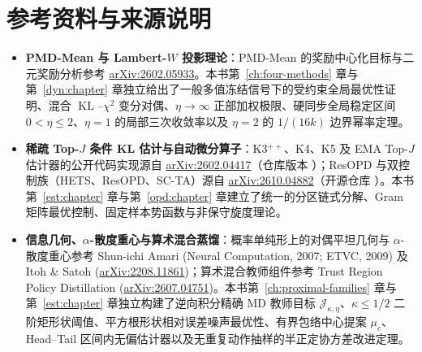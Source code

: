 \documentclass[lang=cn,scheme=chinese,openany]{elegantbook}
\newcommand{\KL}{\operatorname{KL}}
\begin{document}
\chapter*{参考资料与来源说明}
\begingroup\raggedright
\begin{itemize}
\item \textbf{PMD-Mean 与 Lambert-$W$ 投影理论}：PMD-Mean 的奖励中心化目标与二元奖励分析参考 \href{https://arxiv.org/abs/2602.05933}{arXiv:2602.05933}。本书第~\ref{ch:four-methods} 章与第~\ref{dyn:chapter} 章独立给出了一般多值冻结信号下的受约束全局最优性证明、混合 $\KL$--$\chi^2$ 变分对偶、$\eta\to\infty$ 正部加权极限、硬同步全局稳定区间 $0<\eta\le 2$、$\eta=1$ 的局部三次收敛率以及 $\eta=2$ 的 $1/(16k)$ 边界幂率定理。
\item \textbf{稀疏 Top-$J$ 条件 KL 估计与自动微分算子}：K3$^{++}$、K4、K5 及 EMA Top-$J$ 估计器的公开代码实现源自 \href{https://arxiv.org/abs/2602.04417}{arXiv:2602.04417}（仓库版本 \href{https://github.com/LunjunZhang/ema-pg/blob/f9b977632ad948ce935432a517c22291bfaba562/search/verl/trainer/ppo/core_algos.py}{}）；ResOPD 与双控制族（HETS、ResOPD、SC-TA）源自 \href{https://arxiv.org/abs/2610.04882}{arXiv:2610.04882}（开源仓库 \href{https://github.com/InternLM/ResOPD}{}）。本书第~\ref{est:chapter} 章与第~\ref{opd:chapter} 章建立了统一的分区链式分解、Gram 矩阵最优控制、固定样本势函数与非保守旋度理论。
\item \textbf{信息几何、$\alpha$-散度重心与算术混合蒸馏}：概率单纯形上的对偶平坦几何与 $\alpha$-散度重心参考 Shun-ichi Amari (Neural Computation, 2007; ETVC, 2009) 及 Itoh \& Satoh (\href{https://arxiv.org/html/2208.11861}{arXiv:2208.11861})；算术混合教师组件参考 Trust Region Policy Distillation (\href{https://arxiv.org/html/2607.04751v1}{arXiv:2607.04751})。本书第~\ref{ch:proximal-families} 章与第~\ref{est:chapter} 章独立构建了逆向积分精确 MD 教师目标 $\mathcal J_{\kappa,\eta}$、$\kappa\le 1/2$ 二阶矩形状阈值、平方根形状相对误差噪声最优性、有界包络中心提案 $\mu_c$、Head--Tail 区间内无偏估计器以及无重复动作抽样的半正定协方差改进定理。
\end{itemize}
\par\endgroup
\end{document}
